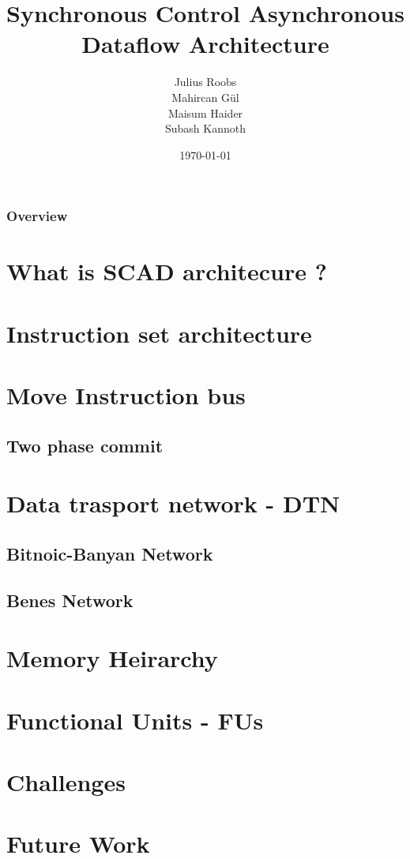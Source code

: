 \documentclass{beamer}
\title[SCAD Architecture]{Synchronous Control Asynchronous Dataflow Architecture}
\author{Julius Roobs \\ Mahircan G{\"u}l \\ Maisum Haider \\ Subash Kannoth }
\institute[TU Kaiserslautern]
{
	Technische Universit{\"a}t Kaiserslautern \\
	\medskip
}
\date{\today}
\begin{document}
\begin{frame}
  \titlepage
\end{frame}

\begin{frame}
\frametitle{Overview}
\tableofcontents
\end{frame}

\section{What is SCAD architecure ?}
\section{Instruction set architecture}
\section{Move Instruction bus}
  \subsection{Two phase commit}
\section{Data trasport network - DTN}
  \subsection{Bitnoic-Banyan Network}
  \subsection{Benes Network}
\section{Memory Heirarchy}
\section{Functional Units - FUs}
\section{Challenges}
\section{Future Work}
\end{document}
